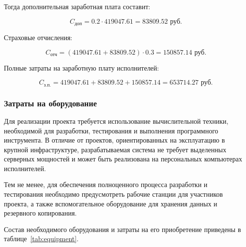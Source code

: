 Тогда дополнительная заработная плата составит:

\begin{equation}
C_{\text{доп}} = 0.2 \cdot 419047.61 = 83809.52 \text{ руб.}
\end{equation}

Страховые отчисления:

\begin{equation}
C_{\text{отч}} =
(419047.61 + 83809.52)\cdot 0.3 = 150857.14 \text{ руб.}
\end{equation}

Полные затраты на заработную плату исполнителей:

\begin{equation}
C_{\text{з.п.}} =
419047.61 + 83809.52 + 150857.14 = 653714.27 \text{ руб.}
\end{equation}

\subsubsection*{Затраты на оборудование}

Для реализации проекта требуется использование вычислительной техники,
необходимой для разработки, тестирования и выполнения программного
инструмента. В отличие от проектов, ориентированных на эксплуатацию в
крупной инфраструктуре, разрабатываемая система не требует выделенных
серверных мощностей и может быть реализована на персональных
компьютерах исполнителей.

Тем не менее, для обеспечения полноценного процесса разработки и
тестирования необходимо предусмотреть рабочие станции для участников
проекта, а также вспомогательное оборудование для хранения данных и
резервного копирования.

Состав необходимого оборудования и затраты на его приобретение
приведены в таблице~\ref{tab:equipment}.

